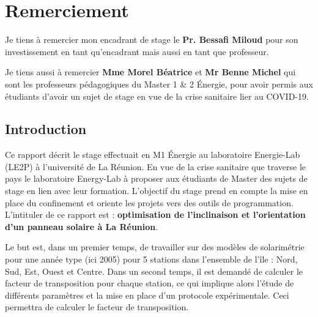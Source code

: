 \documentclass[12pt,a4paper,openright]{report}
\begin{document}
\begin{titlepage}
\begin{figure}
\begin{center}
    
   
 \maketitle %
  		
   \end{center}
 
  \end{figure}
     
 \end{titlepage}

\chapter*{Remerciement}
\begin{center}
Je tiens à remercier mon encadrant de stage le \textbf{Pr. Bessafi Miloud} pour son investissement en tant qu'encadrant mais aussi en tant que professeur.

Je tiens aussi à remercier \textbf{Mme Morel Béatrice} et \textbf{Mr Benne Michel} qui sont les professeurs pédagogiques du Master 1 \& 2 Énergie, pour avoir permis aux étudiants d'avoir un sujet de stage en vue de la crise sanitaire lier au COVID-19.
\end{center}
	\renewcommand{\contentsname}{Sommaire}
	\tableofcontents
	\newpage
	
\section*{Introduction}

Ce rapport décrit le stage effectuait en M1 Énergie au laboratoire Energie-Lab (LE2P) à l'université de La Réunion. En vue de la crise sanitaire que traverse le pays le laboratoire Energy-Lab à proposer aux étudiants de Master des sujets de stage en lien avec leur formation. L'objectif du stage prend en compte la mise en place du confinement et oriente les projets vers des outils de programmation. L'intituler de ce rapport est : \textbf{optimisation de l'inclinaison et l'orientation d'un panneau solaire à La Réunion}. 

Le but est, dans un premier temps, de travailler sur des modèles de solarimétrie pour une année type (ici 2005) pour 5 stations dans  l'ensemble de l'île : Nord, Sud, Est, Ouest et Centre. Dans un second temps, il est demandé de calculer le facteur de transposition pour chaque station, ce qui implique alors l'étude de différents paramètres et la mise en place d'un protocole expérimentale. Ceci permettra de calculer le facteur de transposition.
\end{document}
